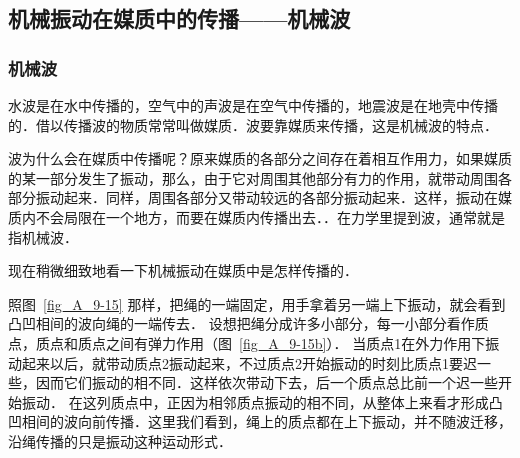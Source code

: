 \subsection{机械振动在媒质中的传播——机械波}
\subsubsection{机械波} 

水波是在水中传播的，空气中的声波是在空气中传播的，地震波是在地壳中传播的．借以传播波的物质常常叫做媒质．波要靠媒质来传播，这是机械波的特点．


波为什么会在媒质中传播呢？原来媒质的各部分之间存在着相互作用力，如果媒质的某一部分发生了振动，那么，由于它对周围其他部分有力的作用，就带动周围各部分振动起来．同样，周围各部分又带动较远的各部分振动起来．这样，振动在媒质内不会局限在一个地方，而要在媒质内传播出去．．在力学里提到波，通常就是指机械波．

现在稍微细致地看一下机械振动在媒质中是怎样传播的．

照图~\ref{fig_A_9-15} 那样，把绳的一端固定，用手拿着另一端上下振动，就会看到凸凹相间的波向绳的一端传去．
设想把绳分成许多小部分，每一小部分看作质点，质点和质点之间有弹力作用（图~\ref{fig_A_9-15b}）．
当质点1在外力作用下振动起来以后，就带动质点2振动起来，不过质点2开始振动的时刻比质点1要迟一些，因而它们振动的相不同．这样依次带动下去，后一个质点总比前一个迟一些开始振动．
在这列质点中，正因为相邻质点振动的相不同，从整体上来看才形成凸凹相间的波向前传播．这里我们看到，绳上的质点都在上下振动，并不随波迁移，沿绳传播的只是振动这种运动形式．

